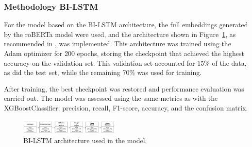 \subsubsection{Methodology BI-LSTM}

For the model based on the BI-LSTM architecture, the full embeddings generated by the roBERTa model were used, and the architecture shown in Figure~\ref{fig:bilstm_architecture}, as recommended in \cite{zhang2018deep}, was implemented. This architecture was trained using the Adam optimizer for 200 epochs, storing the checkpoint that achieved the highest accuracy on the validation set. This validation set accounted for 15\% of the data, as did the test set, while the remaining 70\% was used for training. 

After training, the best checkpoint was restored and performance evaluation was carried out. The model was assessed using the same metrics as with the XGBoostClassifier: precision, recall, F1-score, accuracy, and the confusion matrix.

\begin{figure}[htbp]
  \centering
  \includegraphics[width=0.45\textwidth]{images/bilstm_architecture.png}
  \caption{BI-LSTM architecture used in the model.}
  \label{fig:bilstm_architecture}
\end{figure}
